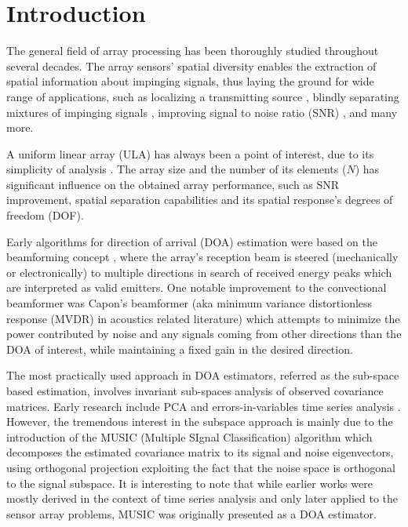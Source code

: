 \chapter{Introduction}
\label{chap:intro}
The general field of array processing has been thoroughly studied throughout several decades.
The array sensors' spatial diversity enables the extraction of spatial information about impinging signals, thus laying the ground for wide range of applications, such as localizing a transmitting source \cite{skolnik2008radar,long2019}, blindly separating mixtures of impinging signals \cite{comon1994independent}, improving signal to noise ratio (SNR) \cite{verdu1998multiuser}, and many more. 
\par A uniform linear array (ULA) has always been a point of interest, due to its simplicity of analysis \cite{van2004optimum,benesty2018}. 
The array size and the number of its elements ($N$) has significant influence on the obtained array performance, such as SNR improvement, spatial separation capabilities and its spatial response's degrees of freedom (DOF).
\par Early algorithms for direction of arrival (DOA) estimation were based on the beamforming concept \cite{krim1996two}, where the array's reception beam is steered (mechanically or electronically) to multiple directions in search of received energy peaks which are interpreted as valid emitters.
One notable improvement to the convectional beamformer \cite{van2004optimum} was Capon's beamformer  (aka minimum variance distortionless response (MVDR) in acoustics related literature) which attempts to minimize the power contributed by noise and any signals coming from other directions than the DOA of interest, while maintaining a fixed gain
in the desired direction.
\par The most practically used approach in DOA estimators, referred as the sub-space based estimation, involves invariant sub-spaces analysis of observed covariance matrices.
Early research include PCA and errors-in-variables time series analysis \cite{krim1996two}.   
However, the tremendous interest in the subspace approach is mainly due to the introduction of the
MUSIC (Multiple SIgnal Classification) algorithm \cite{schmidt1986multiple} which decomposes the estimated covariance matrix to its signal and noise eigenvectors, using orthogonal projection exploiting the fact that the noise space is orthogonal to the signal subspace.
It is interesting to note that while earlier works were mostly derived in the context of time series analysis and only later applied to the sensor array problems, MUSIC was originally presented as a DOA estimator.
